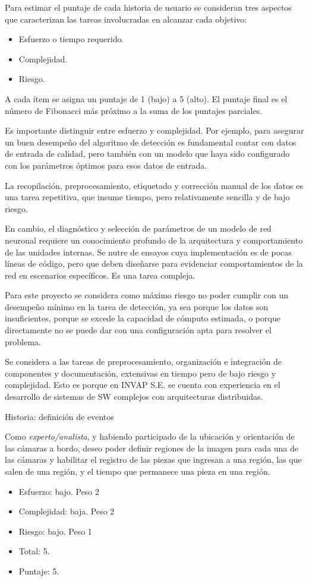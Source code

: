 \documentclass[11pt]{charter}
\begin{document}
Para estimar el puntaje de cada historia de usuario se consideran tres aspectos que caracterizan las tareas involucradas en alcanzar cada objetivo:

\begin{itemize}
	\item Esfuerzo o tiempo requerido.
	\item Complejidad.
	\item Riesgo.
\end{itemize}

A cada ítem se asigna un puntaje de 1 (bajo) a 5 (alto). El puntaje final es el número de Fibonacci más próximo a la suma de los puntajes parciales.

Es importante distinguir entre esfuerzo y complejidad. Por ejemplo, para asegurar un buen desempeño del algoritmo de detección es fundamental contar con datos de entrada de calidad, pero también con un modelo que haya sido configurado con los parámetros óptimos para esos datos de entrada. 

La recopilación, preprocesamiento, etiquetado y corrección manual de los datos es una tarea repetitiva, que insume tiempo, pero relativamente sencilla y de bajo riesgo.

En cambio, el diagnóstico y selección de parámetros de un modelo de red neuronal requiere un conocimiento profundo de la arquitectura y comportamiento de las unidades internas. Se nutre de ensayos cuya implementación es de pocas líneas de código, pero que deben diseñarse para evidenciar comportamientos de la red en escenarios específicos. Es una tarea compleja.

Para este proyecto se considera como máximo riesgo no poder cumplir con un desempeño mínimo en la tarea de detección, ya sea porque los datos son insuficientes, porque se excede la capacidad de cómputo estimada, o porque directamente no se puede dar con una configuración apta para resolver el problema.

Se considera a las tareas de preprocesamiento, organización e integración de componentes y documentación, extensivas en tiempo pero de bajo riesgo y complejidad. Esto es porque en INVAP S.E. se cuenta con experiencia en el desarrollo de sistemas de SW complejos con arquitecturas distribuidas.

Historia: definición de eventos

Como {\em experto/analista}, y habiendo participado de la ubicación y orientación de las cámaras a bordo, deseo poder definir regiones de la imagen para cada una de las cámaras y habilitar el registro de las piezas que ingresan a una región, las que salen de una región, y el tiempo que permanece una pieza en una región. 
\begin{itemize}
	\item Esfuerzo: bajo. Peso 2
	\item Complejidad: baja. Peso 2
	\item Riesgo: bajo. Peso 1
	\item Total: 5.
	\item Puntaje: 5.
\end{itemize}
\end{document}
